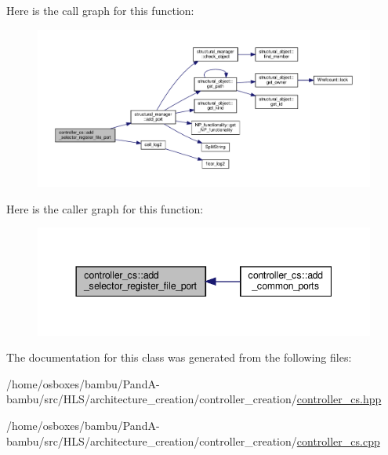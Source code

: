 Here is the call graph for this function\+:
\nopagebreak
\begin{figure}[H]
\begin{center}
\leavevmode
\includegraphics[width=350pt]{d9/dfb/classcontroller__cs_a2230a944eb2a06a9565aeec5c86c68e1_cgraph}
\end{center}
\end{figure}
Here is the caller graph for this function\+:
\nopagebreak
\begin{figure}[H]
\begin{center}
\leavevmode
\includegraphics[width=344pt]{d9/dfb/classcontroller__cs_a2230a944eb2a06a9565aeec5c86c68e1_icgraph}
\end{center}
\end{figure}


The documentation for this class was generated from the following files\+:\begin{DoxyCompactItemize}
\item 
/home/osboxes/bambu/\+Pand\+A-\/bambu/src/\+H\+L\+S/architecture\+\_\+creation/controller\+\_\+creation/\hyperlink{controller__cs_8hpp}{controller\+\_\+cs.\+hpp}\item 
/home/osboxes/bambu/\+Pand\+A-\/bambu/src/\+H\+L\+S/architecture\+\_\+creation/controller\+\_\+creation/\hyperlink{controller__cs_8cpp}{controller\+\_\+cs.\+cpp}\end{DoxyCompactItemize}
